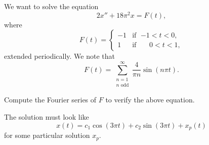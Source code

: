 \begin{example}
We want to solve the equation
\begin{equation*}
2 x'' + 18 \pi^2 x = F(t) ,
\end{equation*}
where
\begin{equation*}
F(t) =
\begin{cases}
-1 & \text{if } \; {-1} < t < 0 , \\
1 & \text{if } \; \phantom{-}0 < t < 1 ,
\end{cases}
\end{equation*}
extended periodically.  We note that
\begin{equation*}
F(t) =
\sum_{\substack{n=1 \\ n \text{ odd}}}^\infty
\frac{4}{\pi n}
\sin (n \pi t) . 
\end{equation*}

\begin{exercise}
Compute the Fourier series of $F$ to verify the above equation.
\end{exercise}

The solution must look like
\begin{equation*}
x(t) = c_1 \cos  (3\pi t) + c_2 \sin (3\pi t) + x_p (t)
\end{equation*}
for some particular solution $x_p$.


\end{example}
